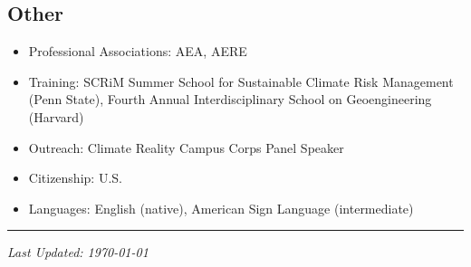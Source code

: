 \documentclass{res} %
\begin{document}
\begin{resume}
\section{Other}

\begin{itemize}
	\item[] Professional Associations: AEA, AERE
	\item[] Training: SCRiM Summer School for Sustainable Climate Risk Management (Penn State), Fourth Annual Interdisciplinary School on Geoengineering (Harvard)
	\item[] Outreach: Climate Reality Campus Corps Panel Speaker
	\item[] Citizenship: U.S.
	\item[] Languages: English (native), American Sign Language (intermediate)
\end{itemize}
\hrule

\vspace{0.1in} %



\centerline{\emph{Last Updated: \today}}
\pagebreak



\end{resume}
\end{document}
